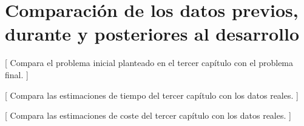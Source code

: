 \chapter{Comparación de los datos previos, durante y posteriores al desarrollo}

[ Compara el problema inicial planteado en el tercer capítulo con el problema final. ]

[ Compara las estimaciones de tiempo del tercer capítulo con los datos reales. ]

[ Compara las estimaciones de coste del tercer capítulo con los datos reales. ]

